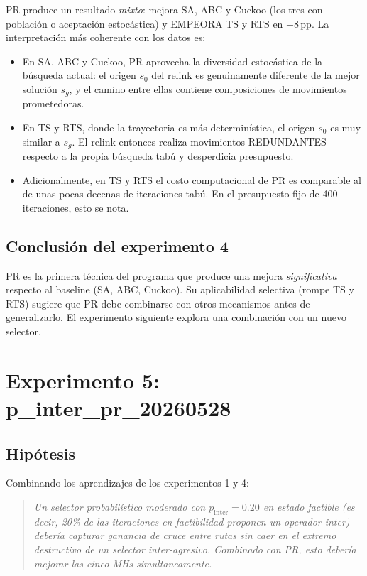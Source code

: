 \documentclass[11pt,a4paper]{article}
\theoremstyle{definition}
\theoremstyle{remark}
\begin{document}
PR produce un resultado \emph{mixto}: mejora SA, ABC y Cuckoo (los tres
con población o aceptación estocástica) y EMPEORA TS y RTS en
$+8\,$pp. La interpretación más coherente con los datos es:

\begin{itemize}
\item En SA, ABC y Cuckoo, PR aprovecha la diversidad estocástica de la
  búsqueda actual: el origen $s_0$ del relink es genuinamente
  diferente de la mejor solución $s_g$, y el camino entre ellas
  contiene composiciones de movimientos prometedoras.
\item En TS y RTS, donde la trayectoria es más determinística, el
  origen $s_0$ es muy similar a $s_g$. El relink entonces realiza
  movimientos REDUNDANTES respecto a la propia búsqueda tabú y
  desperdicia presupuesto.
\item Adicionalmente, en TS y RTS el costo computacional de PR es
  comparable al de unas pocas decenas de iteraciones tabú. En el
  presupuesto fijo de 400 iteraciones, esto se nota.
\end{itemize}

\subsection{Conclusión del experimento 4}

PR es la primera técnica del programa que produce una mejora
\emph{significativa} respecto al baseline (SA, ABC, Cuckoo). Su
aplicabilidad selectiva (rompe TS y RTS) sugiere que PR debe combinarse
con otros mecanismos antes de generalizarlo. El experimento siguiente
explora una combinación con un nuevo selector.

\section{Experimento 5: p\_inter\_pr\_20260528}
\label{sec:exp-pip}

\subsection{Hipótesis}

Combinando los aprendizajes de los experimentos 1 y 4:

\begin{quote}
\textit{Un selector probabilístico moderado con $p_{\text{inter}} = 0.20$
en estado factible (es decir, 20\% de las iteraciones en factibilidad
proponen un operador inter) debería capturar ganancia de cruce entre
rutas sin caer en el extremo destructivo de un selector inter-agresivo.
Combinado con PR, esto debería mejorar las cinco MHs simultaneamente.}
\end{quote}
\end{document}
